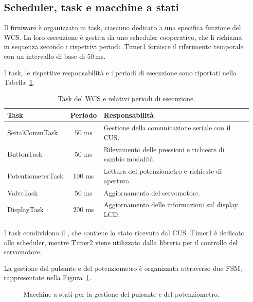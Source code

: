 \FloatBarrier%

\subsection{Scheduler, task e macchine a stati}
Il firmware è organizzato in task, ciascuno dedicato a una specifica funzione del WCS.
La loro esecuzione è gestita da uno scheduler cooperativo, che li richiama in sequenza secondo i rispettivi periodi.
Timer1 fornisce il riferimento temporale con un intervallo di base di \(50\,\mathrm{ms}\).

I task, le rispettive responsabilità e i periodi di esecuzione sono riportati nella Tabella~\ref{tab:wcs-tasks}.


\begin{table}[htbp]
\centering
\begin{tabularx}{\linewidth}{@{}l c X@{}}
\toprule
\textbf{Task} & \textbf{Periodo} & \textbf{Responsabilità} \\
\midrule
SerialCommTask & 50 ms &
Gestione della comunicazione seriale con il CUS. \\

ButtonTask & 50 ms &
Rilevamento delle pressioni e richieste di cambio modalità. \\

PotentiometerTask & 100 ms &
Lettura del potenziometro e richieste di apertura. \\

ValveTask & 50 ms &
Aggiornamento del servomotore. \\

DisplayTask & 200 ms &
Aggiornamento delle informazioni sul display LCD. \\
\bottomrule
\end{tabularx}
\caption{Task del WCS e relativi periodi di esecuzione.}%
\label{tab:wcs-tasks}
\end{table}

I task condividono il , che contiene lo stato ricevuto dal CUS.
Timer1 è dedicato allo scheduler, mentre Timer2 viene utilizzato dalla libreria  per il controllo del servomotore.

La gestione del pulsante e del potenziometro è organizzata attraverso due FSM, rappresentate nella Figura~\ref{fig:wcs-fsms}.

\begin{figure}[htbp]
\centering

\caption{Macchine a stati per la gestione del pulsante e del potenziometro.}%
\label{fig:wcs-fsms}
\end{figure}

